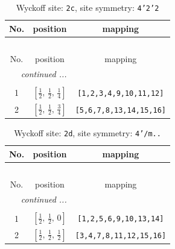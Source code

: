 \documentclass[fleqn,8pt]{jsarticle}
\begin{document}
\renewcommand{\arraystretch}{1.2}
\begin{longtable}{ccc}
\caption{Wyckoff site: {\tt 2c}, site symmetry: {\tt 4'2'2}}
 \\
 \hline \hline
No. & position & mapping \\ \hline \endfirsthead

\multicolumn{2}{l}{\tablename\ \thetable{}} \\
 \hline \hline
No. & position & mapping \\ \hline \endhead

 \hline \hline
\multicolumn{2}{r}{\footnotesize\it continued ...} \\ \endfoot

 \hline \hline
\multicolumn{2}{r}{} \\ \endlastfoot

1 & $\left[ \frac{1}{2},\, \frac{1}{2},\, \frac{1}{4} \right]$ & {\tt [1,2,3,4,9,10,11,12]} \\ \hline
2 & $\left[ \frac{1}{2},\, \frac{1}{2},\, \frac{3}{4} \right]$ & {\tt [5,6,7,8,13,14,15,16]} \\
\end{longtable}
\renewcommand{\arraystretch}{1.2}
\begin{longtable}{ccc}
\caption{Wyckoff site: {\tt 2d}, site symmetry: {\tt 4'/m..}}
 \\
 \hline \hline
No. & position & mapping \\ \hline \endfirsthead

\multicolumn{2}{l}{\tablename\ \thetable{}} \\
 \hline \hline
No. & position & mapping \\ \hline \endhead

 \hline \hline
\multicolumn{2}{r}{\footnotesize\it continued ...} \\ \endfoot

 \hline \hline
\multicolumn{2}{r}{} \\ \endlastfoot

1 & $\left[ \frac{1}{2},\, \frac{1}{2},\, 0 \right]$ & {\tt [1,2,5,6,9,10,13,14]} \\ \hline
2 & $\left[ \frac{1}{2},\, \frac{1}{2},\, \frac{1}{2} \right]$ & {\tt [3,4,7,8,11,12,15,16]} \\
\end{longtable}
\renewcommand{\arraystretch}{1.2}
\end{document}
